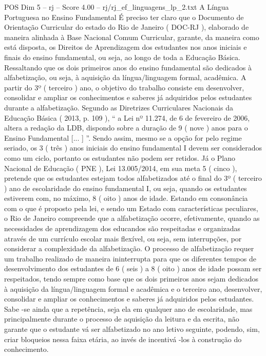 \begin{textsample}{POS Dim 5 – rj – Score 4.00 – rj/rj\_ef\_linguagens\_lp\_2.txt}  \label{ex:f5_pos_193}
A Língua Portuguesa no Ensino Fundamental É preciso ter claro que o Documento de Orientação Curricular do estado do Rio de Janeiro ( DOC-RJ ), elaborado de maneira alinhada à Base Nacional Comum Curricular, garante, da maneira como está disposta, os Direitos de Aprendizagem dos estudantes nos anos iniciais e finais do ensino fundamental, ou seja, ao longo de toda a Educação Básica.
Ressaltando que os dois primeiros anos do ensino fundamental são dedicados à alfabetização, ou seja, à aquisição da língua/linguagem formal, acadêmica.
A partir do 3º ( terceiro ) ano, o objetivo do trabalho consiste em desenvolver, consolidar e ampliar os conhecimentos e saberes já adquiridos pelos estudantes durante a alfabetização.
Segundo as Diretrizes Curriculares Nacionais da Educação Básica ( 2013, p. 109 ), “ a Lei nº 11.274, de 6 de fevereiro de 2006, altera a redação da LDB, dispondo sobre a duração de 9 ( nove ) anos para o Ensino Fundamental [... ] ”.
Sendo assim, mesmo se a opção for pelo regime seriado, os 3 ( três ) anos iniciais do ensino fundamental I devem ser considerados como um ciclo, portanto os estudantes não podem ser retidos.
Já o Plano Nacional de Educação ( PNE ), Lei 13.005/2014, em sua meta 5 ( cinco ), pretende que os estudantes estejam todos alfabetizados até o final do 3º ( terceiro ) ano de escolaridade do ensino fundamental I, ou seja, quando os estudantes estiverem com, no máximo, 8 ( oito ) anos de idade.
Estando em consonância com o que é proposto pela lei, e sendo um Estado com características peculiares, o Rio de Janeiro compreende que a alfabetização ocorre, efetivamente, quando as necessidades de aprendizagem dos educandos são respeitadas e organizadas através de um currículo escolar mais flexível, ou seja, sem interrupções, por considerar a complexidade da alfabetização.
O processo de alfabetização requer um trabalho realizado de maneira ininterrupta para que os diferentes tempos de desenvolvimento dos estudantes de 6 ( seis ) a 8 ( oito ) anos de idade possam ser respeitados, tendo sempre como base que os dois primeiros anos sejam dedicados à aquisição da língua/linguagem formal e acadêmica e o terceiro ano, desenvolver, consolidar e ampliar os conhecimentos e saberes já adquiridos pelos estudantes.
Sabe -se ainda que a repetência, seja ela em qualquer ano de escolaridade, mas principalmente durante o processo de aquisição da leitura e da escrita, não garante que o estudante vá ser alfabetizado no ano letivo seguinte, podendo, sim, criar bloqueios nessa faixa etária, ao invés de incentivá -los à construção do conhecimento.

\end{textsample}
